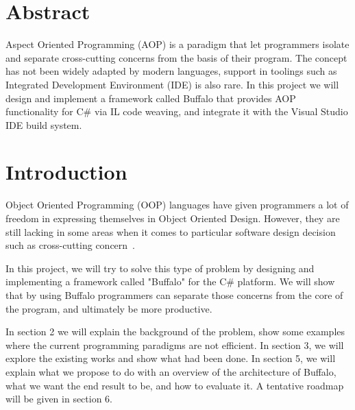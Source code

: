 \newcommand{\etc} {\emph{etc.\/}}
\newcommand{\etal}{\emph{et~al.\/}}
\newcommand{\eg}  {\emph{e.g.\/}}
\newcommand{\ie}  {\emph{i.e.\/}}


\section*{Abstract}
Aspect Oriented Programming (AOP) is a paradigm that let programmers isolate and separate cross-cutting concerns from the basis of their program. The concept has not been widely adapted by modern languages, support in toolings such as Integrated Development Environment (IDE) is also rare. In this project we will design and implement a framework called Buffalo that provides AOP functionality for C\# via IL code weaving, and integrate it with the Visual Studio IDE build system.
\vfill{}

\setcounter{page}{0} 
\newpage{}
\section{Introduction}
Object Oriented Programming (OOP) languages have given programmers a lot of freedom in expressing themselves in Object Oriented Design. However, they are still lacking in some areas when it comes to particular software design decision such as cross-cutting concern~\cite{aop}. 

In this project, we will try to solve this type of problem by designing and implementing a framework called "Buffalo" for the C\# platform. We will show that by using Buffalo programmers can separate those concerns from the core of the program, and ultimately be more productive.

In section 2 we will explain the background of the problem, show some examples where the current programming paradigms are not efficient. In section 3, we will explore the existing works and show what had been done. In section 5, we will explain what we propose to do with an overview of the architecture of Buffalo, what we want the end result to be, and how to evaluate it. A tentative roadmap will be given in section 6.

